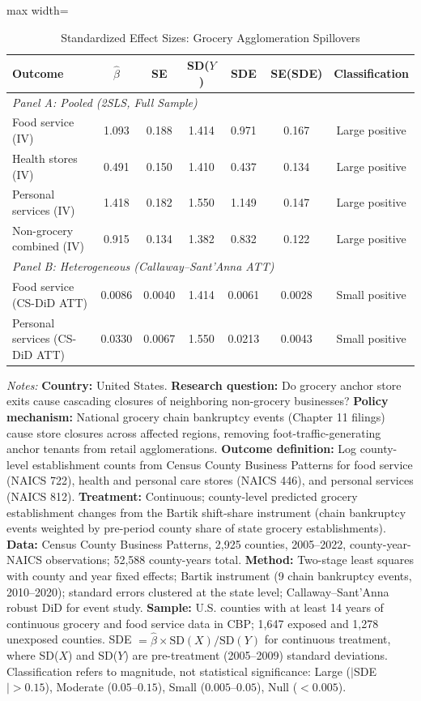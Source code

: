 \begin{table}[htbp]
\centering
\caption{Standardized Effect Sizes: Grocery Agglomeration Spillovers}
\label{tab:sde}
\footnotesize
\begin{adjustbox}{max width=\textwidth}
\begin{tabular}{lcccccc}
\hline\hline
Outcome & $\hat{\beta}$ & SE & SD($Y$) & SDE & SE(SDE) & Classification \\
\hline
\multicolumn{7}{l}{\textit{Panel A: Pooled (2SLS, Full Sample)}} \\
[3pt]
Food service (IV) & 1.093 & 0.188 & 1.414 & 0.971 & 0.167 & Large positive \\
Health stores (IV) & 0.491 & 0.150 & 1.410 & 0.437 & 0.134 & Large positive \\
Personal services (IV) & 1.418 & 0.182 & 1.550 & 1.149 & 0.147 & Large positive \\
Non-grocery combined (IV) & 0.915 & 0.134 & 1.382 & 0.832 & 0.122 & Large positive \\
[6pt]
\multicolumn{7}{l}{\textit{Panel B: Heterogeneous (Callaway--Sant'Anna ATT)}} \\
[3pt]
Food service (CS-DiD ATT) & 0.0086 & 0.0040 & 1.414 & 0.0061 & 0.0028 & Small positive \\
Personal services (CS-DiD ATT) & 0.0330 & 0.0067 & 1.550 & 0.0213 & 0.0043 & Small positive \\
\hline\hline
\end{tabular}
\end{adjustbox}
\begin{tablenotes}
\item \textit{Notes:} \textbf{Country:} United States. \textbf{Research question:} Do grocery anchor store exits cause cascading closures of neighboring non-grocery businesses? \textbf{Policy mechanism:} National grocery chain bankruptcy events (Chapter 11 filings) cause store closures across affected regions, removing foot-traffic-generating anchor tenants from retail agglomerations. \textbf{Outcome definition:} Log county-level establishment counts from Census County Business Patterns for food service (NAICS 722), health and personal care stores (NAICS 446), and personal services (NAICS 812). \textbf{Treatment:} Continuous; county-level predicted grocery establishment changes from the Bartik shift-share instrument (chain bankruptcy events weighted by pre-period county share of state grocery establishments). \textbf{Data:} Census County Business Patterns, 2,925 counties, 2005--2022, county-year-NAICS observations; 52,588 county-years total. \textbf{Method:} Two-stage least squares with county and year fixed effects; Bartik instrument (9 chain bankruptcy events, 2010--2020); standard errors clustered at the state level; Callaway--Sant'Anna robust DiD for event study. \textbf{Sample:} U.S. counties with at least 14 years of continuous grocery and food service data in CBP; 1,647 exposed and 1,278 unexposed counties. SDE $= \hat{\beta} \times \text{SD}(X) / \text{SD}(Y)$ for continuous treatment, where SD($X$) and SD($Y$) are pre-treatment (2005--2009) standard deviations. Classification refers to magnitude, not statistical significance: Large ($|$SDE$| > 0.15$), Moderate ($0.05$--$0.15$), Small ($0.005$--$0.05$), Null ($< 0.005$).

\end{tablenotes}
\end{table}
